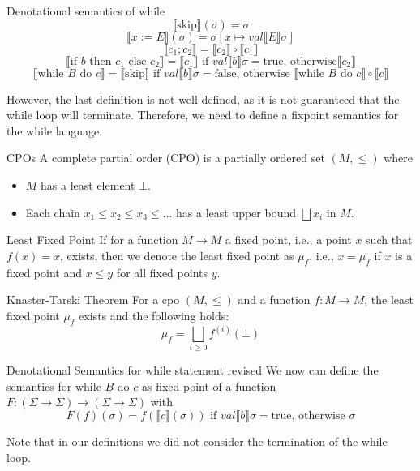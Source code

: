 \documentclass{beamer}
\begin{document}
      \begin{frame}{Denotational semantics of while}
        \[\llbracket\text{skip}\rrbracket(\sigma)=\sigma\]
        \[\llbracket x:=E\rrbracket(\sigma)=\sigma[x\mapsto val\llbracket E\rrbracket\sigma]\]
        \[\llbracket c_1;c_2\rrbracket=\llbracket c_2\rrbracket\circ\llbracket c_1\rrbracket\]
        \[\llbracket \text{if }b\text{ then }c_1\text{ else }c_2\rrbracket=\llbracket c_1\rrbracket\text{ if }val\llbracket b\rrbracket\sigma=\text{true, otherwise} \llbracket c_2\rrbracket\]
        \[\llbracket \text{while }B\text{ do }c\rrbracket=\llbracket\text{skip}\rrbracket\text{ if }val\llbracket b\rrbracket\sigma=\text{false, otherwise }\llbracket \text{while }B\text{ do }c\rrbracket\circ\llbracket c\rrbracket\]
        \vspace*{0.5cm}

        However, the last definition is not well-defined, as it is not guaranteed that the while loop will terminate. Therefore, we need to define a fixpoint semantics for the while language.
  
      \end{frame}

      \begin{frame}{CPOs}
        A complete partial order (CPO) is a partially ordered set $(M,\leq)$ where
        \begin{itemize}
          \item $M$ has a least element $\bot$.
          \item Each chain $x_1\leq x_2\leq x_3\leq\ldots$ has a least upper bound $\bigsqcup x_i$ in $M$.
          \end{itemize}

        \end{frame}

        \begin{frame}{Least Fixed Point}
          If for a function $M\to M$ a fixed point, i.e., a point $x$ such that $f(x)=x$, exists, then we denote the least fixed point as $\mu_f$, i.e., $x=\mu_f$ if $x$ is a fixed point and $x\leq y$ for all fixed points $y$.
     
          \end{frame}

          \begin{frame}{Knaster-Tarski Theorem}
            For a cpo $(M,\leq)$ and a function $f:M\to M$, the least fixed point $\mu_f$ exists and the following holds:
            \[\mu_f=\bigsqcup_{i\geq 0}f^{(i)}(\bot)\]
          \end{frame}
      
          \begin{frame}{Denotational Semantics for while statement revised}
            We now can define the semantics for $\text{while }B\text{ do }c$ as fixed point of a function $F:(\Sigma\to\Sigma)\to(\Sigma\to\Sigma)$ with 
            \[F(f)(\sigma)=f(\llbracket c\rrbracket(\sigma))\text{ if }val\llbracket b\rrbracket\sigma=\text{true, otherwise }\sigma\]

            \vspace*{0.5cm}
            Note that in our definitions we did not consider the termination of the while loop. 
          \end{frame}
  
\end{document}
